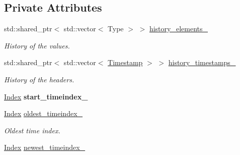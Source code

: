\subsection*{Private Attributes}
\begin{DoxyCompactItemize}
\item 
std\+::shared\+\_\+ptr$<$ std\+::vector$<$ Type $>$ $>$ \hyperlink{classreal__time__tools_1_1ThreadsafeTimeseries_ac23cd95c9d5f6344e20db8d318f23005}{history\+\_\+elements\+\_\+}\hypertarget{classreal__time__tools_1_1ThreadsafeTimeseries_ac23cd95c9d5f6344e20db8d318f23005}{}\label{classreal__time__tools_1_1ThreadsafeTimeseries_ac23cd95c9d5f6344e20db8d318f23005}

\begin{DoxyCompactList}\small\item\em History of the values. \end{DoxyCompactList}\item 
std\+::shared\+\_\+ptr$<$ std\+::vector$<$ \hyperlink{classreal__time__tools_1_1ThreadsafeTimeseries_a41e36f99889a580ce56491e573fa77b0}{Timestamp} $>$ $>$ \hyperlink{classreal__time__tools_1_1ThreadsafeTimeseries_a7f90089325fee66a71a413e68f8ab02c}{history\+\_\+timestamps\+\_\+}\hypertarget{classreal__time__tools_1_1ThreadsafeTimeseries_a7f90089325fee66a71a413e68f8ab02c}{}\label{classreal__time__tools_1_1ThreadsafeTimeseries_a7f90089325fee66a71a413e68f8ab02c}

\begin{DoxyCompactList}\small\item\em History of the headers. \end{DoxyCompactList}\item 
\hyperlink{classreal__time__tools_1_1ThreadsafeTimeseries_a9364696c534468d7ad927883b16ca981}{Index} {\bfseries start\+\_\+timeindex\+\_\+}\hypertarget{classreal__time__tools_1_1ThreadsafeTimeseries_aa05382a6a6288769cade6f02a25d5d11}{}\label{classreal__time__tools_1_1ThreadsafeTimeseries_aa05382a6a6288769cade6f02a25d5d11}

\item 
\hyperlink{classreal__time__tools_1_1ThreadsafeTimeseries_a9364696c534468d7ad927883b16ca981}{Index} \hyperlink{classreal__time__tools_1_1ThreadsafeTimeseries_a07285b5905c1b4c73830a4f69dbd306b}{oldest\+\_\+timeindex\+\_\+}\hypertarget{classreal__time__tools_1_1ThreadsafeTimeseries_a07285b5905c1b4c73830a4f69dbd306b}{}\label{classreal__time__tools_1_1ThreadsafeTimeseries_a07285b5905c1b4c73830a4f69dbd306b}

\begin{DoxyCompactList}\small\item\em Oldest time index. \end{DoxyCompactList}\item 
\hyperlink{classreal__time__tools_1_1ThreadsafeTimeseries_a9364696c534468d7ad927883b16ca981}{Index} \hyperlink{classreal__time__tools_1_1ThreadsafeTimeseries_a7fd574dac314ee5d72ffdb5d578c13ac}{newest\+\_\+timeindex\+\_\+}\hypertarget{classreal__time__tools_1_1ThreadsafeTimeseries_a7fd574dac314ee5d72ffdb5d578c13ac}{}\label{classreal__time__tools_1_1ThreadsafeTimeseries_a7fd574dac314ee5d72ffdb5d578c13ac}


\end{DoxyCompactItemize}
